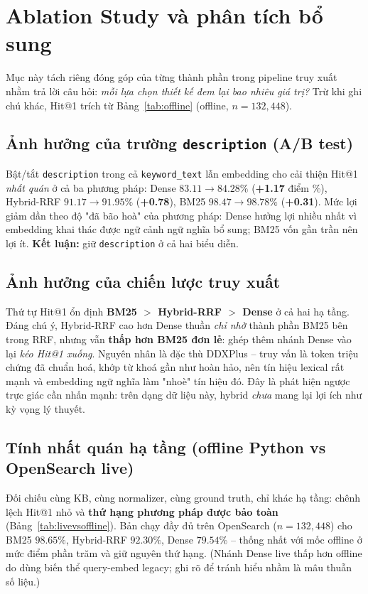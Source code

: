 \section{Ablation Study và phân tích bổ sung}

Mục này tách riêng đóng góp của từng thành phần trong pipeline truy xuất nhằm
trả lời câu hỏi: \emph{mỗi lựa chọn thiết kế đem lại bao nhiêu giá trị?} Trừ khi
ghi chú khác, Hit@1 trích từ Bảng~\ref{tab:offline} (offline, $n=132{,}448$).

\subsection{Ảnh hưởng của trường \texttt{description} (A/B test)}
Bật/tắt \texttt{description} trong cả \texttt{keyword\_text} lẫn embedding cho cải
thiện Hit@1 \emph{nhất quán} ở cả ba phương pháp:
Dense $83.11 \rightarrow 84.28\%$ (\textbf{+1.17} điểm \%),
Hybrid-RRF $91.17 \rightarrow 91.95\%$ (\textbf{+0.78}),
BM25 $98.47 \rightarrow 98.78\%$ (\textbf{+0.31}).
Mức lợi giảm dần theo độ "đã bão hoà" của phương pháp: Dense hưởng lợi nhiều nhất
vì embedding khai thác được ngữ cảnh ngữ nghĩa bổ sung; BM25 vốn gần trần nên lợi
ít. \textbf{Kết luận:} giữ \texttt{description} ở cả hai biểu diễn.

\subsection{Ảnh hưởng của chiến lược truy xuất}
Thứ tự Hit@1 ổn định \textbf{BM25 $>$ Hybrid-RRF $>$ Dense} ở cả hai hạ tầng.
Đáng chú ý, Hybrid-RRF cao hơn Dense thuần \emph{chỉ nhờ} thành phần BM25 bên
trong RRF, nhưng vẫn \textbf{thấp hơn BM25 đơn lẻ}: ghép thêm nhánh Dense vào lại
\emph{kéo Hit@1 xuống}. Nguyên nhân là đặc thù DDXPlus -- truy vấn là token triệu
chứng đã chuẩn hoá, khớp từ khoá gần như hoàn hảo, nên tín hiệu lexical rất mạnh
và embedding ngữ nghĩa làm "nhoè" tín hiệu đó. Đây là phát hiện ngược trực giác
cần nhấn mạnh: trên dạng dữ liệu này, hybrid \emph{chưa} mang lại lợi ích như kỳ
vọng lý thuyết.

\subsection{Tính nhất quán hạ tầng (offline Python vs OpenSearch live)}
Đối chiếu cùng KB, cùng normalizer, cùng ground truth, chỉ khác hạ tầng: chênh
lệch Hit@1 nhỏ và \textbf{thứ hạng phương pháp được bảo toàn}
(Bảng~\ref{tab:livevsoffline}). Bản chạy đầy đủ trên OpenSearch ($n=132{,}448$)
cho BM25 $98.65\%$, Hybrid-RRF $92.30\%$, Dense $79.54\%$ -- thống nhất với mốc
offline ở mức điểm phần trăm và giữ nguyên thứ hạng. (Nhánh Dense live thấp hơn
offline do dùng biến thể query-embed legacy; ghi rõ để tránh hiểu nhầm là mâu
thuẫn số liệu.)

